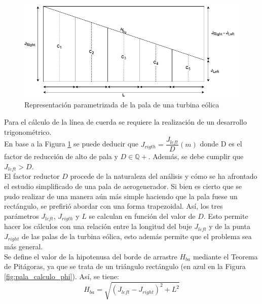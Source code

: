 \begin{figure}[H]
    \centering
    \includegraphics[width=1\textwidth]{images/planteo chord line.drawio.png}
    \caption{Representación parametrizada de la pala de una turbina eólica}
    
    \label{fig:pala_desarrollo_chord}
\end{figure}

Para el cálculo de la línea de cuerda se requiere la realización de un desarrollo trigonométrico. \\

En base a la Figura \ref{fig:pala_desarrollo_chord} se puede deducir que
$J_{rigth} = \dfrac{J_{left}}{D} (m)$ donde D es el factor de reducción de alto de pala y $D \in \mathbb{Q+}$. Además, se debe cumplir que $J_{left} > D$.\\

El factor reductor $D$ procede de la naturaleza del análisis y cómo se ha afrontado el estudio simplificado de una pala de aerogenerador. Si bien es cierto que se pudo realizar de una manera aún más simple haciendo que la pala fuese un rectángulo, se prefirió abordar con una forma trapezoidal. Así, los tres parámetros $J_{left}$, $J_{rigth}$ y $L$ se calculan en función del valor de $D$. Esto permite hacer los cálculos con una relación entre la longitud del buje $J_{left}$ y de la punta $J_{right}$ de las palas de la turbina eólica, esto además permite que el problema sea más general. \\

Se define el valor de la hipotenusa del borde de arrastre $H_{ba}$ mediante el Teorema de Pitágoras, ya que se trata de un triángulo rectángulo (en azul en la Figura \ref{fig:pala_calculo_phi}). Así, se tiene:
\begin{equation}
H_{ba} = \sqrt{(J_{left} - J_{right})^{2} + L^{2}}
\label{def_hipotenusa_pala}
\end{equation}


